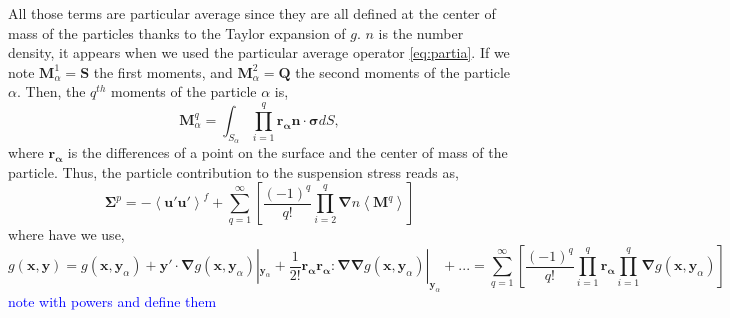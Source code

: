 All those terms are particular average since they are all defined at the center of mass of the particles thanks to the Taylor expansion of $g$.
$n$ is the number density, it appears when we used the particular average operator \ref{eq:partia}. 
If we note $\bm{M}_\alpha^1 = \bm{S}$ the first moments, and $\bm{M}_\alpha^2 = \bm{Q}$ the second moments of the particle $\alpha$.
Then, the $q^{th}$ moments of the particle $\alpha$ is,
\begin{equation*}
    \bm{M}^q_\alpha = \int_{S_\alpha} \prod^q_{i=1} \bm{\bm{r}_\alpha } \bm{n}\cdot\bm{\sigma}dS,
    \label{eq:qthM}
\end{equation*}
where $\bm{\bm{r}_\alpha }$ is the differences of a point on the surface and the center of mass of the particle. 
Thus, the particle contribution to the suspension stress reads as,
\begin{equation*}
    \bm{\Sigma}^p = -\left<\bm{u'u'}\right>^f + \sum_{q=1}^\infty \left[\frac{(-1)^q}{q!} \prod^q_{i=2}\bm{\nabla} n\left< \bm{M}^q\right>\right]
\end{equation*}
where have we use, 
\begin{equation}
    g(\bm{x},\bm{y}) = g(\bm{x},\bm{y}_\alpha) + \bm{y'} \cdot \bm{\nabla} g(\bm{x},\bm{y}_\alpha)|_{\bm{y}_\alpha} + \frac{1}{2!} \bm{\bm{r}_\alpha \bm{r}_\alpha }:\bm{\nabla}\bm{\nabla}g(\bm{x},\bm{y}_\alpha)|_{\bm{y}_\alpha} + ... = 
    \sum_{q=1}^\infty \left[\frac{(-1)^q}{q!} \prod^q_{i=1}\bm{\bm{r}_\alpha}\prod^q_{i=1}\bm{\nabla}  g(\bm{x},\bm{y}_\alpha)\right]
    \label{eq:expansion}
\end{equation}
\textcolor{blue}{note with powers and define them}



